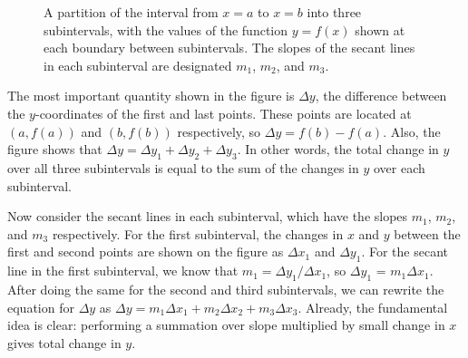 \documentclass{myarticle}
\theoremstyle{nospace}
\newtheorem{old series theorem}{Theorem}
\newenvironment{series theorem}{\begin{mdframed}\begin{old series theorem}}{\end{old series theorem}\end{mdframed}}
\begin{document}
\begin{figure}[htb!] \centering
{}
\caption{A partition of the interval from $x = a$ to $x = b$ into three subintervals, with the values of the function $y = f(x)$ shown at each boundary between subintervals. The slopes of the secant lines in each subinterval are designated $m_1$, $m_2$, and $m_3$.}
\label{fig:ftc}
\end{figure}

The most important quantity shown in the figure is $\Delta y$, the difference between the $y$-coordinates of the first and last points. These points are located at $(a, f(a))$ and $(b, f(b))$ respectively, so $\Delta y = f(b) - f(a)$. Also, the figure shows that $\Delta y = \Delta y_1 + \Delta y_2 + \Delta y_3$. In other words, the total change in $y$ over all three subintervals is equal to the sum of the changes in $y$ over each subinterval.

Now consider the secant lines in each subinterval, which have the slopes $m_1$, $m_2$, and $m_3$ respectively. For the first subinterval, the changes in $x$ and $y$ between the first and second points are shown on the figure as $\Delta x_1$ and $\Delta y_1$. For the secant line in the first subinterval, we know that $m_1 = \Delta y_1/\Delta x_1$, so $\Delta y_1$ = $m_1 \Delta x_1$. After doing the same for the second and third subintervals, we can rewrite the equation for $\Delta y$ as $\Delta y = m_1\Delta x_1 + m_2\Delta x_2 + m_3\Delta x_3$. Already, the fundamental idea is clear: performing a summation over slope multiplied by small change in $x$ gives total change in $y$.
\end{document}
